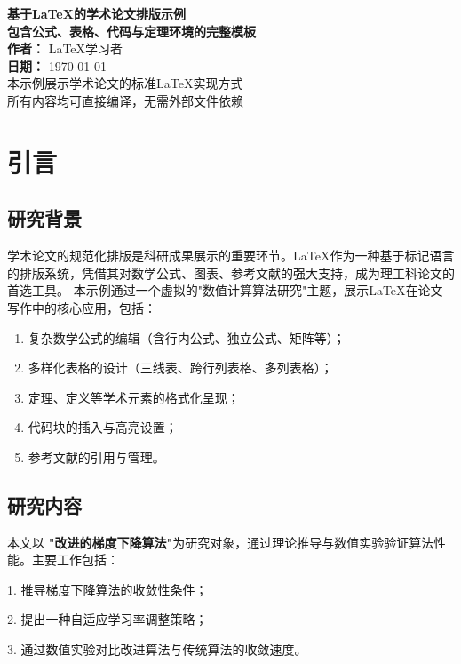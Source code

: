 \documentclass[12pt,a4paper,oneside]{article} %
\begin{document}
\begin{titlepage}
    \centering
    \vspace*{3cm}
    
    {\Huge \bfseries   基于LaTeX的学术论文排版示例}\\[0.8cm]%
    {\large \bfseries 包含公式、表格、代码与定理环境的完整模板}\\[2cm]
    
    {\Large \textbf{作者：  }\quad \quad  LaTeX学习者}\\[0.5cm]%
    {\Large \textbf{日期：} \today}\\[3cm]
    
    {\large 本示例展示学术论文的标准LaTeX实现方式\\
    所有内容均可直接编译，无需外部文件依赖}
    
    \vfill%
    \end{titlepage}


\tableofcontents
\newpage


\section{引言}
\subsection{研究背景}
学术论文的规范化排版是科研成果展示的重要环节。LaTeX作为一种基于标记语言的排版系统，凭借其对数学公式、图表、参考文献的强大支持，成为理工科论文的首选工具。
本示例通过一个虚拟的"数值计算算法研究"主题，展示LaTeX在论文写作中的核心应用，包括：
\begin{enumerate}[label=(\alph*)]
   \item   复杂数学公式的编辑（含行内公式、独立公式、矩阵等）；
 \item 多样化表格的设计（三线表、跨行列表格、多列表格）；
  \item  定理、定义等学术元素的格式化呈现；
  \item  代码块的插入与高亮设置；
  \item \quad 参考文献的引用与管理。
\end{enumerate}

\subsection{研究内容}
{  本文以{ \bfseries"改进的梯度下降算法"}为研究对象，通过理论推导与数值实验验证算法性能。主要工作包括：

1. 推导梯度下降算法的收敛性条件；

2. 提出一种自适应学习率调整策略；

3. 通过数值实验对比改进算法与传统算法的收敛速度。
}
\end{document}
